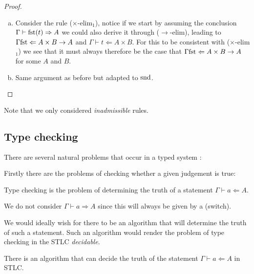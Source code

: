 \begin{proof}
\begin{enumerate}[(a)]
        \item Consider the rule ($\times$-elim${}_1$), notice if we start by assuming the conclusion $\Gamma \vdash \mathrm{fst} (t) \Rightarrow A$ we could also derive it through ($\to$-elim), leading to $\Gamma \mathrm{fst} \Leftarrow A \times B \to A$ and $\Gamma \vdash t \Leftarrow A \times B$. For this to be consistent with ($\times$-elim${}_1$) we see that it must always therefore be the case that $\Gamma \mathrm{fst} \Leftarrow A \times B \to A$ for some $A$ and $B$.
        \item Same argument as before but adapted to $\mathrm{snd}$. 
    \end{enumerate}
\end{proof}

\begin{remark}
    Note that we only considered \emph{inadmissible} rules.
\end{remark}

\subsection{Type checking}

There are several natural problems that occur in a typed system \cite{BarendregtHenk2013Lcwt}:

Firstly there are the problems of checking whether a given judgement is true:

\begin{defin}
    Type checking is the problem of determining the truth of a statement $\Gamma \vdash a \Leftarrow A$.
\end{defin}

\begin{remark}
    We do not consider $\Gamma \vdash a \Rightarrow A$ since this will always be given by a (switch).
\end{remark}

We would ideally wish for there to be an algorithm that will determine the truth of such a statement. Such an algorithm would render the problem of type checking in the STLC \emph{decidable}.

\begin{theorem}\label{type_checking}
    There is an algorithm that can decide the truth of the statement $\Gamma \vdash a \Leftarrow A$ in STLC.
\end{theorem}

